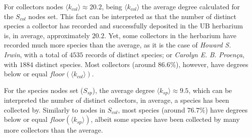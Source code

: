 For collectors nodes $\langle k_{col}\rangle \approx 20.2$, being $\langle k_{col}\rangle$ the average degree calculated for the $S_{col}$ nodes set. This fact can be interpreted as that the number of distinct species a collector has recorded and successfully deposited in the UB herbarium is, in average, approximately $20.2$. Yet, some collectors in the herbarium have recorded much more species than the average, as it is the case of \textit{Howard S. Irwin}, with a total of $4535$ records of distinct species; or \textit{Carolyn E. B. Proença}, with $1884$ distinct species. Most collectors (around $86.6\%$), however, have degrees below or equal $floor(\langle k_{col} \rangle)$.

For the species nodes set ($S_{sp}$), the average degree $\langle k_{sp}\rangle \approx 9.5$, which can be interpreted the number of distinct collectors, in average, a species has been collected by. Similarly to nodes in $S_{col}$, most species (around $76.7\%$) have degrees below or equal $floor(\langle k_{sp}\rangle)$, albeit some species have been collected by many more collectors than the average.


